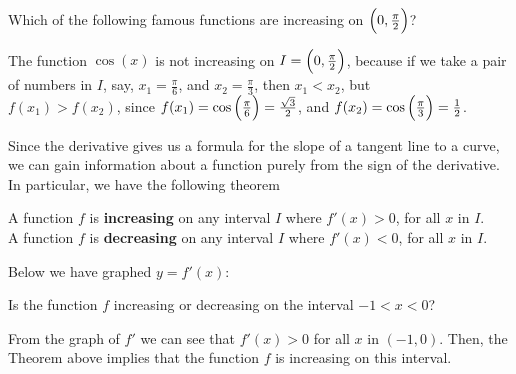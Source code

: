\documentclass{ximera}
\begin{document}
\begin{question}
\author{Nela Lakos}
Which of the following famous functions are increasing on $\Bigl(0,\frac{\pi}{2}\Bigr)$?
\begin{selectAll}
\end{selectAll}
\begin {explanation} The function $\cos{(x)}$ is not increasing on $I=\Bigl(0,\frac{\pi}{2}\Bigr)$, because 
if we take a pair of numbers in $I$, say,  
  $x_{1}=\frac{\pi}{6}$, and   $x_{2}=\frac{\pi}{3}$, then
   $x_{1}<x_{2}$,  but \\$f(x_{1})>f(x_{2})$,  since 
 $f(x_{1})=\cos{\Bigl(\frac{\pi}{6}\Bigr)}=\frac{\sqrt{3}}{2}$, and $f(x_{2})=\cos{}\Bigl(\frac{\pi}{3}\Bigr)=\frac{1}{2}$.
 \end{explanation}
\end{question}
Since the derivative gives us a formula for the slope of a tangent
line to a curve, we can gain information about a function purely from
the sign of the derivative.  In particular, we have the following theorem
\begin{theorem}
A function $f$ is \textbf{increasing} on any interval $I$ where $f'(x)>0$, for all $x$ in $I$.\\
A function $f$  is \textbf{decreasing} on any interval $I$ where $f'(x)<0$, for all $x$ in $I$.\\
 \end{theorem}


\begin{question}
  Below we have graphed $y=f'(x)$:
  \begin{image}
  \end{image}
  Is the function $f$ increasing or decreasing on
  the interval $-1<x<0$?
  \begin{prompt}
    \begin{multipleChoice}
    \end{multipleChoice}
  \end{prompt}
  \begin{explanation} From the graph of  $f'$ we can see that $f'(x)>0$ for all $x$ in $(-1,0)$. Then, the Theorem above implies that the function $f$ is increasing on this interval.
      \end{explanation}
\end{question}
\end{document}
